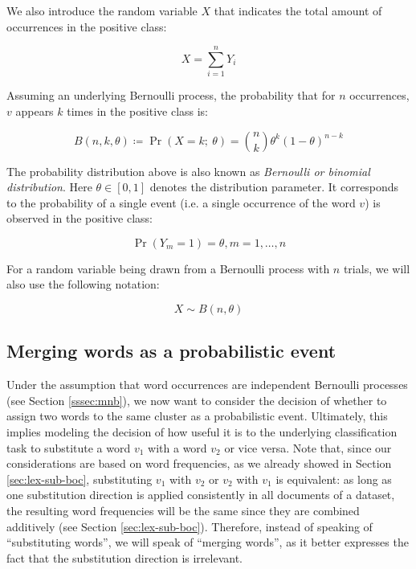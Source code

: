 We also introduce the random variable $X$ that indicates the total
amount of occurrences in the positive class:

\begin{equation*}
	X = \sum\limits_{i=1}^n Y_i
\end{equation*}

Assuming an underlying Bernoulli process, the probability that for $n$
occurrences, $v$ appears $k$ times in the positive class is: 

\begin{equation*}
	B(n,k,\theta) \coloneqq \Pr(X=k;~\theta) = \binom{n}{k}
	\theta^k(1-\theta)^{n-k}
\end{equation*}

The probability distribution above is also known as \emph{Bernoulli or binomial
distribution}.  Here $\theta \in [0,1]$ denotes the distribution
parameter. It corresponds to the probability of a single event (i.e. a
single occurrence of the word $v$) is observed in the positive class:

\begin{equation*}
	\Pr(Y_m = 1) = \theta, m=1,\ldots,n
\end{equation*}
 
For a random variable being drawn from a Bernoulli process with $n$ trials, we
will also use the following notation:

\begin{equation*}
	X \sim B(n,\theta)
\end{equation*}
\subsection{Merging words as a probabilistic event}

Under the assumption that word occurrences are independent Bernoulli processes
(see Section \ref{sssec:mnb}), we now want to consider the decision of whether
to assign two words to the same cluster as a probabilistic event. Ultimately,
this implies modeling the decision of how useful it is to the underlying
classification task to substitute a word $v_1$ with a word $v_2$ or vice versa. 
Note that, since our considerations are based on word frequencies, as we already
showed in Section \ref{sec:lex-sub-boc}, substituting $v_1$ with $v_2$ or $v_2$
with $v_1$ is equivalent: as long as one substitution direction is applied
consistently in all documents of a dataset, the resulting word frequencies will
be the same since they are combined additively  (see Section
\ref{sec:lex-sub-boc}). Therefore, instead of speaking of ``substituting words'', we will speak of ``merging words'', as it better expresses the fact
that the substitution direction is irrelevant. 


